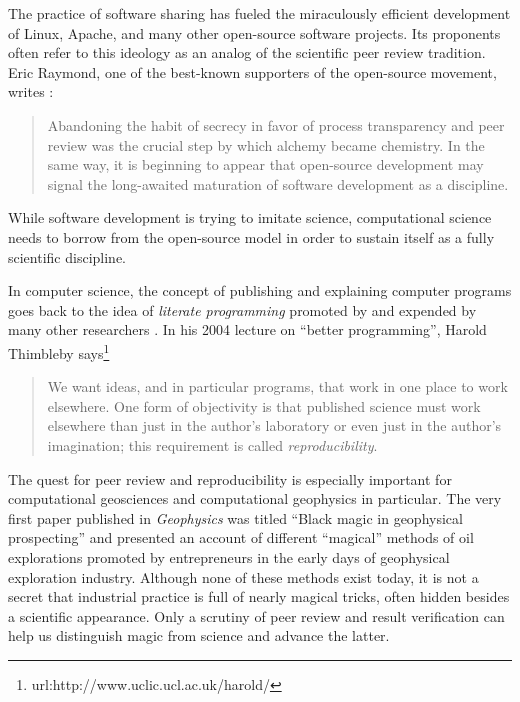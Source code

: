 The practice of software sharing has fueled the miraculously efficient
development of Linux, Apache, and many other open-source software
projects.  Its proponents often refer to this ideology as an analog of
the scientific peer review tradition. Eric Raymond, one of the
best-known supporters of the open-source movement, writes
\cite[]{taoup}:
\begin{quote}
  Abandoning the habit of secrecy in favor of process transparency and
  peer review was the crucial step by which alchemy became chemistry.
  In the same way, it is beginning to appear that open-source
  development may signal the long-awaited maturation of software
  development as a discipline.
\end{quote}
While software development is trying to imitate science, computational
science needs to borrow from the open-source model in order to sustain
itself as a fully scientific discipline.

In computer science, the concept of publishing and explaining computer
programs goes back to the idea of \emph{literate programming} promoted
by \cite{knuth} and expended by many other researchers
\cite[]{thimbleby}. In his 2004 lecture on ``better programming'',
Harold Thimbleby says\footnote{url:http://www.uclic.ucl.ac.uk/harold/}
\begin{quote}
  We want ideas, and in particular programs, that work in one place to
  work elsewhere. One form of objectivity is that published science
  must work elsewhere than just in the author's laboratory or even
  just in the author's imagination; this requirement is called
  \emph{reproducibility}.
\end{quote}

The quest for peer review and reproducibility is especially important
for computational geosciences and computational geophysics in
particular. The very first paper published in \emph{Geophysics} was
titled ``Black magic in geophysical prospecting''
\cite[]{GEO01-01-00010008,TLE02-03-00280031} and presented an account
of different ``magical'' methods of oil explorations promoted by
entrepreneurs in the early days of geophysical exploration industry.
Although none of these methods exist today, it is not a secret that
industrial practice is full of nearly magical tricks, often hidden
besides a scientific appearance. Only a scrutiny of peer review and
result verification can help us distinguish magic from science and
advance the latter.


